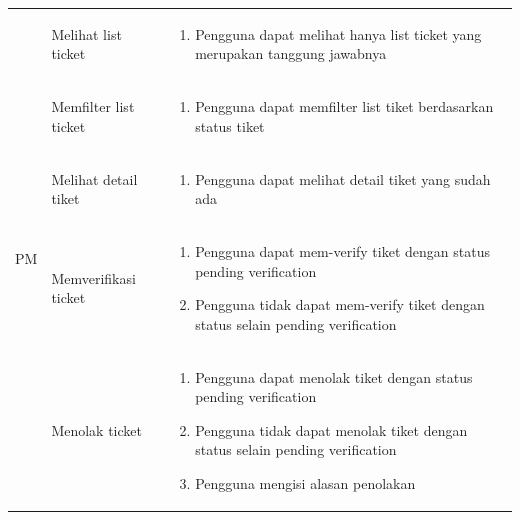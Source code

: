 \documentclass[12pt]{article}
\begin{document}
\begin{enumerate}[label=\textbf{5.\arabic*.}]
\begin{enumerate}[label=\textbf{5.2.\arabic*.}]
\begin{longtable}{ |l|l|p{}| }
            \multirow{8}{*}{PM} & Melihat list ticket     & \begin{enumerate}[label=\arabic*.] 
                                                                \item Pengguna dapat melihat hanya list ticket yang merupakan tanggung jawabnya 
                                                            \end{enumerate}\\\cline{2-3}
                                & Memfilter list ticket & \begin{enumerate}[label=\arabic*.]
                                                                \item Pengguna dapat memfilter list tiket berdasarkan status tiket  
                                                            \end{enumerate}\\\cline{2-3}
                                & Melihat detail tiket  & \begin{enumerate}[label=\arabic*.]
                                                                \item Pengguna dapat melihat detail tiket yang sudah ada 
                                                            \end{enumerate}\\\cline{2-3}
                                & Memverifikasi ticket  & \begin{enumerate}[label=\arabic*.]
                                                                \item Pengguna dapat mem-verify tiket dengan status pending verification
                                                                \item Pengguna tidak dapat mem-verify tiket dengan status selain pending verification
                                                            \end{enumerate}\\\cline{2-3}
                                & Menolak ticket        & \begin{enumerate}[label=\arabic*.]
                                                                \item Pengguna dapat menolak tiket dengan status pending verification
                                                                \item Pengguna tidak dapat menolak tiket dengan status selain pending verification
                                                                \item Pengguna mengisi alasan penolakan

\end{enumerate}
\end{longtable}
\end{enumerate}
\end{enumerate}
\end{document}
